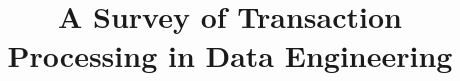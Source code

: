 \documentclass{sig-alternate-05-2015}
\begin{document}






%

\title{A Survey of Transaction Processing in Data Engineering}
%
%
%
%
%
\end{document}
